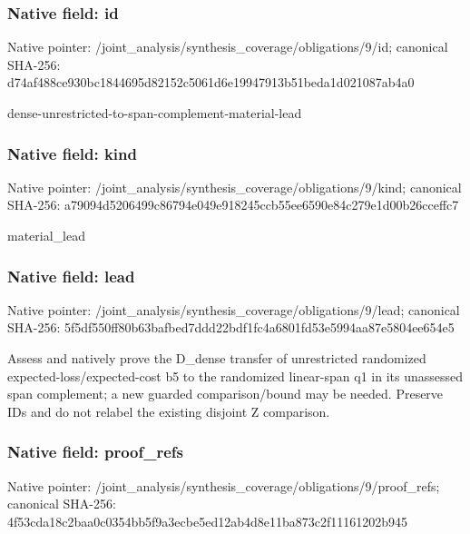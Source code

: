 \documentclass[10pt,a4paper]{article}
\begin{document}
\subsubsection{Native field: id}
Native pointer: /joint\_\allowbreak{}analysis/synthesis\_\allowbreak{}coverage/obligations/9/id; canonical SHA-256: d74af488ce930bc1844695d82152c5061d6e19947913b51beda1d021087ab4a0

\begingroup\raggedright\sloppy dense-unrestricted-to-span-complement-material-lead\par\endgroup

\subsubsection{Native field: kind}
Native pointer: /joint\_\allowbreak{}analysis/synthesis\_\allowbreak{}coverage/obligations/9/kind; canonical SHA-256: a79094d5206499c86794e049e918245ccb55ee6590e84c279e1d00b26cceffc7

\begingroup\raggedright\sloppy material\_\allowbreak{}lead\par\endgroup

\subsubsection{Native field: lead}
Native pointer: /joint\_\allowbreak{}analysis/synthesis\_\allowbreak{}coverage/obligations/9/lead; canonical SHA-256: 5f5df550ff80b63bafbed7ddd22bdf1fc4a6801fd53e5994aa87e5804ee654e5

\begingroup\raggedright\sloppy Assess and natively prove the D\_\allowbreak{}dense transfer of unrestricted randomized expected-loss/\allowbreak{}expected-cost b5 to the randomized linear-span q1 in its unassessed span complement;\allowbreak{} a new guarded comparison/\allowbreak{}bound may be needed. Preserve IDs and do not relabel the existing disjoint Z comparison.\par\endgroup

\subsubsection{Native field: proof\_\allowbreak{}refs}
Native pointer: /joint\_\allowbreak{}analysis/synthesis\_\allowbreak{}coverage/obligations/9/proof\_\allowbreak{}refs; canonical SHA-256: 4f53cda18c2baa0c0354bb5f9a3ecbe5ed12ab4d8e11ba873c2f11161202b945
\end{document}
